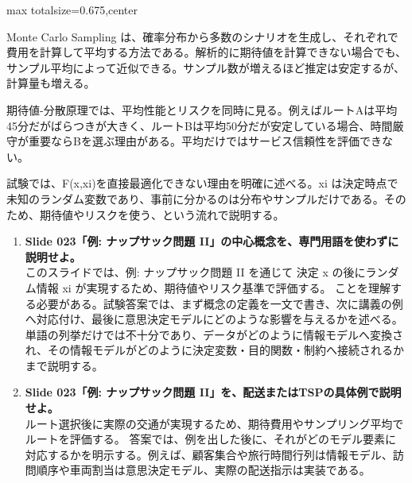 \begin{adjustbox}{max totalsize={\textwidth}{0.675\textheight},center}
\begin{minipage}{\textwidth}
\begin{minipage}[t]{0.485\textwidth}
Monte Carlo Sampling は、確率分布から多数のシナリオを生成し、それぞれで費用を計算して平均する方法である。解析的に期待値を計算できない場合でも、サンプル平均によって近似できる。サンプル数が増えるほど推定は安定するが、計算量も増える。\par
期待値-分散原理では、平均性能とリスクを同時に見る。例えばルートAは平均45分だがばらつきが大きく、ルートBは平均50分だが安定している場合、時間厳守が重要ならBを選ぶ理由がある。平均だけではサービス信頼性を評価できない。\par
試験では、F(x,xi)を直接最適化できない理由を明確に述べる。xi は決定時点で未知のランダム変数であり、事前に分かるのは分布やサンプルだけである。そのため、期待値やリスクを使う、という流れで説明する。\par
{}
\begin{enumerate}
\item \textbf{Slide 023「例: ナップサック問題 II」の中心概念を、専門用語を使わずに説明せよ。}\\このスライドでは、例: ナップサック問題 II を通じて 決定 x の後にランダム情報 xi が実現するため、期待値やリスク基準で評価する。 ことを理解する必要がある。試験答案では、まず概念の定義を一文で書き、次に講義の例へ対応付け、最後に意思決定モデルにどのような影響を与えるかを述べる。単語の列挙だけでは不十分であり、データがどのように情報モデルへ変換され、その情報モデルがどのように決定変数・目的関数・制約へ接続されるかまで説明する。
\item \textbf{Slide 023「例: ナップサック問題 II」を、配送またはTSPの具体例で説明せよ。}\\ルート選択後に実際の交通が実現するため、期待費用やサンプリング平均でルートを評価する。 答案では、例を出した後に、それがどのモデル要素に対応するかを明示する。例えば、顧客集合や旅行時間行列は情報モデル、訪問順序や車両割当は意思決定モデル、実際の配送指示は実装である。
\end{enumerate}
\end{minipage}
\end{minipage}
\end{adjustbox}

